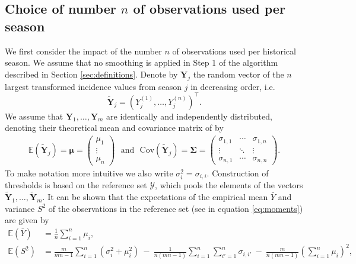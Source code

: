 \documentclass{article}
\newcommand{\mean}{\bar{y}}
\begin{document}
\subsection{Choice of number $n$ of observations used per season}
\label{subsec:choice_n}

We first consider the impact of the number $n$ of observations used per historical season. We assume that no smoothing is applied in Step 1 of the algorithm described in Section \ref{sec:definitions}. Denote by $\mathbf{Y}_j$ the random vector of the $n$ largest transformed incidence values from season $j$ in decreasing order, i.e.
$$
\tilde{\mathbf{Y}}_j = (Y^{(1)}_j, \dots, Y^{(n)}_j)^\top.
$$
We assume that $\mathbf{Y}_1, \dots, \mathbf{Y}_m$ are identically and independently distributed, denoting their theoretical mean and covariance matrix of by
\begin{align}
\mathbb{E}\left(\tilde{\mathbf{Y}}_j\right) = \boldsymbol{\mu} = \left(\begin{array}{c}
\mu_1\\
\vdots\\
\mu_n
\end{array}\right) \ \ \ \text{and} \ \ \ \text{Cov}\left(\tilde{\mathbf{Y}}_j\right) = \boldsymbol{\Sigma} =
\left(\begin{array}{ccc}
\sigma_{1, 1} & \cdots & \sigma_{1, n}\\
\vdots & \ddots &\vdots\\
\sigma_{n, 1} & \cdots & \sigma_{n, n}
\end{array}\right).
\end{align}
To make notation more intuitive we also write $\sigma^2_i = \sigma_{i, i}$. Construction of thresholds is based on the reference set $\mathcal{Y}$, which pools the elements of the vectors $\tilde{\mathbf{Y}}_1, \dots, \tilde{\mathbf{Y}}_m$. It can be shown that the expectations of the empirical mean $\bar{Y}$ and variance $S^2$ of the observations in the reference set (see in equation \eqref{eq:moments}) are given by
\begin{align}
\mathbb{E}(\bar{Y}) & = \frac{1}{n} \sum_{i = 1}^n \mu_i,
\label{eq:expectation_mu}\\
\mathbb{E}(S^2) & = \frac{m}{mn - 1} \sum_{i = 1}^n (\sigma_{i}^2 + \mu_i^2) \ - \ \frac{1}{n(mn - 1)} \sum_{i = 1}^n \sum_{i' = 1}^n \sigma_{i,i'} \ - \ \frac{m}{n(mn - 1)}\left(\sum_{i = 1}^n \mu_i\right)^2,
\label{eq:expectation_sigma2}
\end{align}
\end{document}
